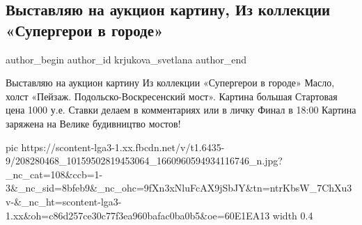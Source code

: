  
 
 
 
 
 
\subsection{Выставляю на аукцион картину, Из коллекции «Супергерои в городе»}
\label{sec:29_06_2021.fb.krjukova_svetlana.1.kartina_prodazha}
\ifcmt
 author_begin
   author_id krjukova_svetlana
 author_end
\fi

Выставляю на аукцион картину 
Из коллекции «Супергерои в городе»
Масло, холст 
«Пейзаж. Подольско-Воскресенский мост». 
Картина большая 
Стартовая цена 1000 у.е.
Ставки делаем в комментариях или в личку
Финал в 18:00
Картина заряжена на Велике будивництво мостов!

\ifcmt
  pic https://scontent-lga3-1.xx.fbcdn.net/v/t1.6435-9/208280468_10159502819453064_1660960594934116746_n.jpg?_nc_cat=108&ccb=1-3&_nc_sid=8bfeb9&_nc_ohc=9fXn3xNluFcAX9jSbJY&tn=ntrKbsW_7ChXu3v-&_nc_ht=scontent-lga3-1.xx&oh=c86d257ce30c77f3ea960bafac0ba0b5&oe=60E1EA13
  width 0.4
\fi
